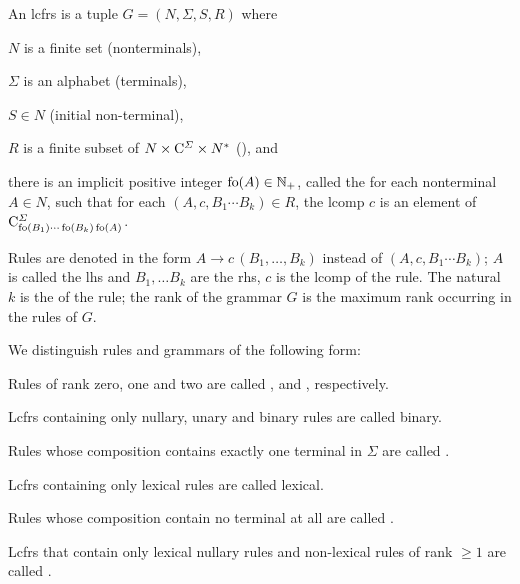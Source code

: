 \documentclass[../document.tex]{subfiles}
\begin{document}
    \begin{definition}
        An \gls{lcfrs} is a tuple \(G=(N, \varSigma, S, R)\) where
        \begin{compactenum}[(i)]
            \item \(N\) is a finite set (\glspl{nonterminal}),
            \item \(\varSigma\) is an alphabet (\glspl{terminal}),
            \item \(S \in N\) (initial non-terminal),
            \item \(R\) is a finite subset of \(N \times \mathrm{C}^\varSigma \times N^*\) (), and
            \item there is an implicit positive integer \(\operatorname{fo}(A) \in \mathbb{N}_+\), called the  for each nonterminal \(A \in N\), such that
            for each \((A, c, B_1\cdots B_k) \in R\), the \gls{lcomp} \(c\) is an element of \(\mathrm{C}^\varSigma_{\operatorname{fo}(B_1) \cdots \operatorname{fo}(B_k) \operatorname{fo}(A)}\).
        \end{compactenum}

        Rules are denoted in the form \(A \to c\,(B_1, \ldots, B_k)\) instead of \((A, c, B_1 \cdots B_k)\); \(A\) is called the \gls{lhs} and \(B_1, \ldots B_k\) are the \gls{rhs}, \(c\) is the \gls*{lcomp} of the \gls*{rule}.
        The natural \(k\) is the  of the rule; the \gls*{rank} of the grammar \(G\) is the maximum rank occurring in the rules of \(G\).
    \end{definition}

    \begin{definition}
        We distinguish rules and grammars of the following form:
        \begin{compactitem}
            \item Rules of rank zero, one and two are called ,  and , respectively.
            \item Lcfrs containing only nullary, unary and binary rules are called \gls*{binary}.
            \item Rules whose composition contains exactly one terminal in \(\varSigma\) are called .
            \item Lcfrs containing only lexical rules are called \gls*{lexical}.
            \item Rules whose composition contain no terminal at all are called .
            \item Lcfrs that contain only lexical nullary rules and non-lexical rules of rank \(\ge 1\) are called .
        \end{compactitem}
    \end{definition}
\end{document}
